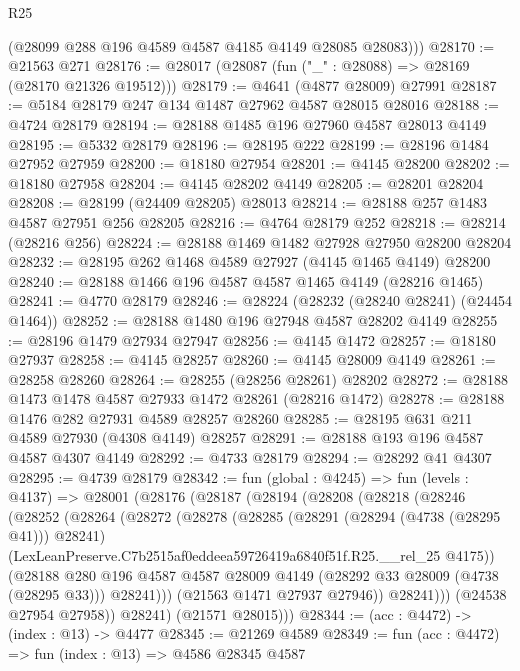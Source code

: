 \begin{lexlean}{R25}
\begin{coremodule}
        (@28099 @288 @196 @4589 @4587 @4185 @4149 @28085 @28083)))
@28170 := @21563 @271
@28176 := @28017 (@28087 (fun ("_" : @28088) => @28169 (@28170 @21326 @19512)))
@28179 := @4641 (@4877 @28009) @27991
@28187 := @5184 @28179 @247 @134 @1487 @27962 @4587 @28015 @28016
@28188 := @4724 @28179
@28194 := @28188 @1485 @196 @27960 @4587 @28013 @4149
@28195 := @5332 @28179
@28196 := @28195 @222
@28199 := @28196 @1484 @27952 @27959
@28200 := @18180 @27954
@28201 := @4145 @28200
@28202 := @18180 @27958
@28204 := @4145 @28202 @4149
@28205 := @28201 @28204
@28208 := @28199 (@24409 @28205) @28013
@28214 := @28188 @257 @1483 @4587 @27951 @256 @28205
@28216 := @4764 @28179 @252
@28218 := @28214 (@28216 @256)
@28224 := @28188 @1469 @1482 @27928 @27950 @28200 @28204
@28232 := @28195 @262 @1468 @4589 @27927 (@4145 @1465 @4149) @28200
@28240 := @28188 @1466 @196 @4587 @4587 @1465 @4149 (@28216 @1465)
@28241 := @4770 @28179
@28246 := @28224 (@28232 (@28240 @28241) (@24454 @1464))
@28252 := @28188 @1480 @196 @27948 @4587 @28202 @4149
@28255 := @28196 @1479 @27934 @27947
@28256 := @4145 @1472
@28257 := @18180 @27937
@28258 := @4145 @28257
@28260 := @4145 @28009 @4149
@28261 := @28258 @28260
@28264 := @28255 (@28256 @28261) @28202
@28272 := @28188 @1473 @1478 @4587 @27933 @1472 @28261 (@28216 @1472)
@28278 := @28188 @1476 @282 @27931 @4589 @28257 @28260
@28285 := @28195 @631 @211 @4589 @27930 (@4308 @4149) @28257
@28291 := @28188 @193 @196 @4587 @4587 @4307 @4149
@28292 := @4733 @28179
@28294 := @28292 @41 @4307
@28295 := @4739 @28179
@28342 := fun (global : @4245) =>
  fun (levels : @4137) =>
  @28001
    (@28176
      (@28187
        (@28194
          (@28208
            (@28218
              (@28246
                (@28252
                  (@28264
                    (@28272
                      (@28278
                        (@28285
                          (@28291 (@28294 (@4738 (@28295 @41))) @28241)
                          (LexLeanPreserve.C7b2515af0eddeea59726419a6840f51f.R25.__rel_25 @4175))
                        (@28188
                          @280
                          @196
                          @4587
                          @4587
                          @28009
                          @4149
                          (@28292 @33 @28009 (@4738 (@28295 @33)))
                          @28241)))
                    (@21563 @1471 @27937 @27946))
                  @28241)))
            (@24538 @27954 @27958))
          @28241)
        (@21571 @28015)))
@28344 := (acc : @4472) -> (index : @13) -> @4477
@28345 := @21269 @4589
@28349 := fun (acc : @4472) => fun (index : @13) => @4586 @28345 @4587

\end{coremodule}
\end{lexlean}
